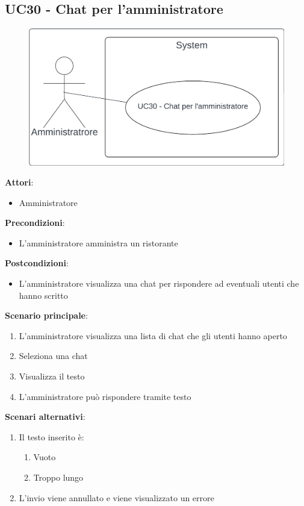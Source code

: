 \subsection{UC30 - Chat per l'amministratore}\label{usecase:30}
\begin{figure}[H]
    \centering
    \includegraphics[width=0.75\linewidth]{ucd/UCD30.png}
\end{figure}
\textbf{Attori}:
\begin{itemize}
    \item Amministratore
\end{itemize}
\textbf{Precondizioni}:
\begin{itemize}
    \item L'amministratore amministra un ristorante
\end{itemize}
\textbf{Postcondizioni}:
\begin{itemize}
    \item L'amministratore visualizza una chat per rispondere ad eventuali utenti che hanno scritto
\end{itemize}
\textbf{Scenario principale}:
\begin{enumerate}
    \item L'amministratore visualizza una lista di chat che gli utenti hanno aperto
    \item Seleziona una chat
    \item Visualizza il testo
    \item L'amministratore può rispondere tramite testo
\end{enumerate}
\textbf{Scenari alternativi}:
\begin{enumerate}
    \item Il testo inserito è:
    \begin{enumerate}
        \item Vuoto
        \item Troppo lungo
    \end{enumerate}
    \item L'invio viene annullato e viene visualizzato un errore
\end{enumerate}